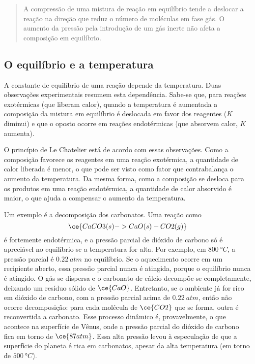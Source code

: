 \begin{quote}
A compressão de uma mistura de reação em equilíbrio tende a deslocar a reação na direção que reduz o número de moléculas em fase gás. O aumento da
pressão pela introdução de um gás inerte não afeta a composição em equilíbrio.
\end{quote}

\subsection{O equilíbrio e a temperatura}

A constante de equilíbrio de uma reação depende da temperatura. Duas observações experimentais resumem esta dependência. Sabe-se que, para reações
exotérmicas (que liberam calor), quando a temperatura é aumentada a composição da mistura em equilíbrio é deslocada em favor dos reagentes (\(K\)
diminui) e que o oposto ocorre em reações endotérmicas (que absorvem calor, \(K\) aumenta).

O princípio de Le Chatelier está de acordo com essas observações. Como a composição favorece os reagentes em uma reação exotérmica, a quantidade de
calor liberada é menor, o que pode ser visto como fator que contrabalança o aumento da temperatura. Da mesma forma, como a composição se desloca para
os produtos em uma reação endotérmica, a quantidade de calor absorvido é maior, o que ajuda a compensar o aumento da temperatura.

Um exemplo é a decomposição dos carbonatos. Uma reação como \[
    \ce{ CaCO3(s) -> CaO(s) + CO2(g) }
\] é fortemente endotérmica, e a pressão parcial de dióxido de carbono só é apreciável no equilíbrio se a temperatura for alta. Por exemplo, em
\(\qty{800}{\unit{\degree C}}\), a pressão parcial é \(\qty{0,22}{\unit{atm}}\) no equilíbrio. Se o aquecimento ocorre em um recipiente aberto, essa
pressão parcial nunca é atingida, porque o equilíbrio nunca é atingido. O gás se dispersa e o carbonato de cálcio decompõe-se completamente, deixando
um resíduo sólido de \(\ce{CaO}\). Entretanto, se o ambiente já for rico em dióxido de carbono, com a pressão parcial acima de
\(\qty{0,22}{\unit{atm}}\), então não ocorre decomposição: para cada molécula de \(\ce{CO2}\) que se forma, outra é reconvertida a carbonato. Esse
processo dinâmico é, provavelmente, o que acontece na superfície de Vênus, onde a pressão parcial do dióxido de carbono fica em torno de
\(\ce{87 atm}\). Essa alta pressão levou à especulação de que a superfície do planeta é rica em carbonatos, apesar da alta temperatura (em torno de
\(\qty{500}{\unit{\degree C}}\)).

